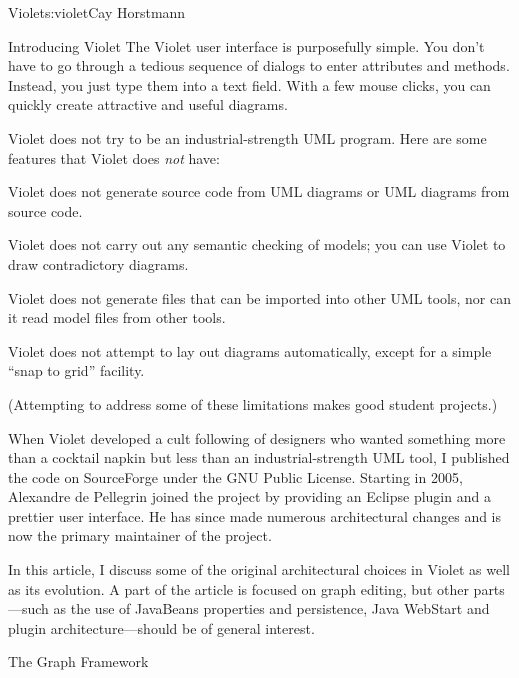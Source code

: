 \begin{aosachapter}{Violet}{s:violet}{Cay Horstmann}
\begin{aosasect1}{Introducing Violet}
The Violet user interface is purposefully simple. You don't have to go
through a tedious sequence of dialogs to enter attributes and
methods. Instead, you just type them into a text field. With a few
mouse clicks, you can quickly create attractive and useful diagrams.

Violet does not try to be an industrial-strength UML program. Here are
some features that Violet does \emph{not} have:

\begin{aosaitemize}

\item Violet does not generate source code from UML diagrams or UML
  diagrams from source code.

\item Violet does not carry out any semantic checking of models; you
  can use Violet to draw contradictory diagrams.

\item Violet does not generate files that can be imported into other
  UML tools, nor can it read model files from other tools.

\item Violet does not attempt to lay out diagrams automatically,
  except for a simple ``snap to grid'' facility.

\end{aosaitemize}

\noindent (Attempting to address some of these limitations makes good student
projects.)

When Violet developed a cult following of designers who wanted
something more than a cocktail napkin but less than an
industrial-strength UML tool, I published the code on SourceForge
under the GNU Public License. Starting in 2005, Alexandre de Pellegrin
joined the project by providing an Eclipse plugin and a prettier user
interface. He has since made numerous architectural changes and is now
the primary maintainer of the project.

In this article, I discuss some of the original architectural choices
in Violet as well as its evolution. A part of the article is focused
on graph editing, but other parts---such as the use of JavaBeans
properties and persistence, Java WebStart and plugin
architecture---should be of general interest.

\end{aosasect1}

\begin{aosasect1}{The Graph Framework}


\end{aosasect1}
\end{aosachapter}
